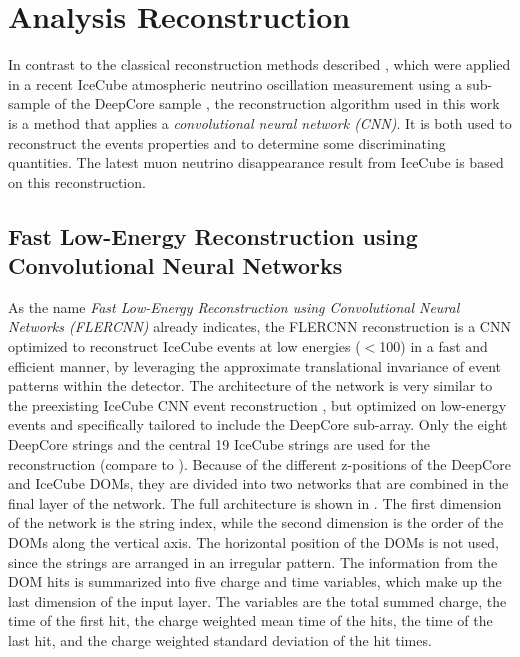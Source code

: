 \section{Analysis Reconstruction} 

In contrast to the classical reconstruction methods described , which were applied in a recent IceCube atmospheric neutrino oscillation measurement using a sub-sample of the DeepCore sample , the reconstruction algorithm used in this work is a method that applies a \textit{convolutional neural network (CNN)}. It is both used to reconstruct the events properties and to determine some discriminating quantities. The latest muon neutrino disappearance result from IceCube  is based on this reconstruction.


\subsection{Fast Low-Energy Reconstruction using Convolutional Neural Networks} 

As the name \textit{Fast Low-Energy Reconstruction using Convolutional Neural Networks (FLERCNN)} already indicates, the FLERCNN reconstruction  \cite{flercnn}is a CNN optimized to reconstruct IceCube events at low energies ($<$\SI{100}{\gev}) in a fast and efficient manner, by leveraging the approximate translational invariance of event patterns within the detector. The architecture of the network is very similar to the preexisting IceCube CNN event reconstruction , but optimized on low-energy events and specifically tailored to include the DeepCore sub-array. Only the eight DeepCore strings and the central 19 IceCube strings are used for the reconstruction (compare to ). Because of the different z-positions of the DeepCore and IceCube DOMs, they are divided into two networks that are combined in the final layer of the network. The full architecture is shown in . The first dimension of the network is the string index, while the second dimension is the order of the DOMs along the vertical axis. The horizontal position of the DOMs is not used, since the strings are arranged in an irregular pattern. The information from the DOM hits is summarized into five charge and time variables, which make up the last dimension of the input layer. The variables are the total summed charge, the time of the first hit, the charge weighted mean time of the hits, the time of the last hit, and the charge weighted standard deviation of the hit times.


